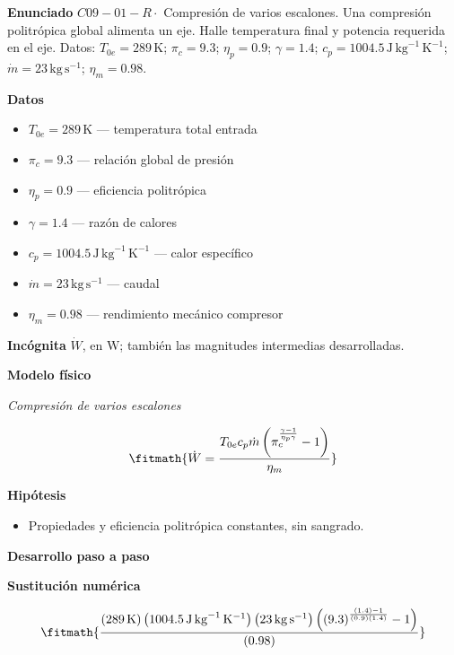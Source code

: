 \documentclass[10pt,openany]{book}
\begin{document}
\begin{tcolorbox}[title={Problema resuelto 1}, studiumworked, breakable]

\noindent\textbf{Enunciado}
\(C09-01-R \cdot\) Compresión de varios escalones. Una compresión politrópica global alimenta un eje. Halle temperatura final y potencia requerida en el eje. Datos: \(T_{0e}=289\, \mathrm{K}\); \(\pi_c=9.3\); \(\eta_p=0.9\); \(\gamma=1.4\); \(c_p=1004.5\, \mathrm{J}\,\mathrm{kg}^{-1}\,\mathrm{K}^{-1}\); \(\dot m=23\, \mathrm{kg}\,\mathrm{s}^{-1}\); \(\eta_m=0.98\).

\noindent\textbf{Datos}
\begin{itemize}
\item $T_{0e} = 289\,\mathrm{K}$ — temperatura total entrada
\item $\pi_c = 9.3$ — relación global de presión
\item $\eta_p = 0.9$ — eficiencia politrópica
\item $\gamma = 1.4$ — razón de calores
\item $c_p = 1004.5\,\mathrm{J}\,\mathrm{kg}^{-1}\,\mathrm{K}^{-1}$ — calor específico
\item $\dot m = 23\,\mathrm{kg}\,\mathrm{s}^{-1}$ — caudal
\item $\eta_m = 0.98$ — rendimiento mecánico compresor
\end{itemize}

\noindent\textbf{Incógnita}
$\dot{W}$, en $\mathrm{W}$; también las magnitudes intermedias desarrolladas.

\noindent\textbf{Modelo físico}

\noindent\textit{Compresión de varios escalones}

\[
\fitmath{\dot{W}=\frac{T_{0e} c_p \dot m \left(\pi_c^{\frac{\gamma - 1}{\eta_p \gamma}} - 1\right)}{\eta_m}}
\]

\noindent\textbf{Hipótesis}
\begin{itemize}
\item Propiedades y eficiencia politrópica constantes, sin sangrado.
\end{itemize}

\noindent\textbf{Desarrollo paso a paso}



\noindent\textbf{Sustitución numérica}

\[
\fitmath{\frac{\left(289\,\mathrm{K}\right) \left(1004.5\,\mathrm{J}\,\mathrm{kg}^{-1}\,\mathrm{K}^{-1}\right) \left(23\,\mathrm{kg}\,\mathrm{s}^{-1}\right) \left(\left(9.3\right)^{\frac{\left(1.4\right) - 1}{\left(0.9\right) \left(1.4\right)}} - 1\right)}{\left(0.98\right)}}
\]


\end{tcolorbox}
\end{document}
